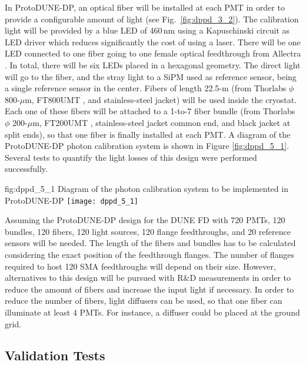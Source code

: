 In ProtoDUNE-DP, an optical fiber will be installed at each PMT in order to provide a configurable amount of light (see Fig.~\ref{fig:dppd_3_2}). The calibration light will be provided by a blue LED of 460\,nm using a Kapuschinski circuit as LED driver which reduces significantly the cost of using a laser. There will be one LED connected to one fiber going to one female optical feedthrough from Allectra \cite{allectra}. In total,  there will be six LEDs placed in a hexagonal geometry. The direct light will go to the fiber, and the stray light to a SiPM used as reference sensor, being a single reference sensor in the center. Fibers of length 22.5-m (from Thorlabs $\phi$ 800-$\mu$m, FT800UMT \cite{ft800umt}, and stainless-steel jacket) will be used inside the cryostat. Each one of these fibers will be attached to a 1-to-7 fiber bundle (from Thorlabs $\phi$ 200-$\mu$m, FT200UMT \cite{ft200umt}, stainless-steel jacket common end, and black jacket at split ends), so that one fiber is finally installed at each PMT. A diagram of the ProtoDUNE-DP photon calibration system is shown in Figure \ref{fig:dppd_5_1}. Several tests to quantify the light losses of this design were performed successfully. 

\begin{dunefigure}{fig:dppd_5_1}
{Diagram of the photon calibration system to be implemented in ProtoDUNE-DP}
\texttt{[image: dppd\_5\_1]}
\end{dunefigure}

Assuming the ProtoDUNE-DP design for the DUNE FD with 720 PMTs, 120 bundles, 120 fibers, 120 light sources, 120 flange feedthroughs, and 20 reference sensors will be needed. The length of the fibers and bundles has to be calculated considering the exact position of the feedthrough flanges. The number of flanges required to host 120 SMA feedthroughs will depend on their size. However, alternatives to this design will be pursued with R\&D measurements in order to reduce the amount of fibers and increase the input light if necessary. In order to reduce the number of fibers, light diffusers can be used, so that one fiber can illuminate at least 4 PMTs. For instance, a diffuser could be placed at the ground grid. 

\subsection{Validation Tests}
\label{sec:fddp-pd-5.2}

